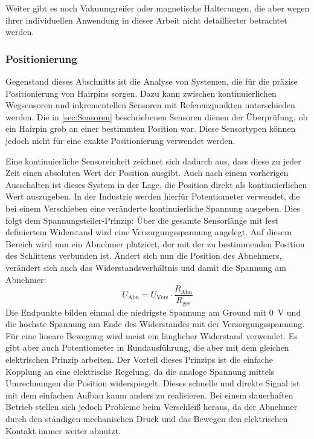 Weiter gibt es noch Vakuumgreifer oder magnetische Halterungen, die aber wegen ihrer individuellen Anwendung in dieser Arbeit
nicht detaillierter betrachtet werden.

%
%
\subsubsection{Positionierung}\label{sec:PositionierungsSystem}
Gegenstand dieses Abschnitts ist die Analyse von Systemen, die für die präzise Positionierung von Hairpins sorgen. Dazu kann
zwischen kontinuierlichen Wegsensoren und inkrementellen Sensoren mit Referenzpunkten unterschieden werden. Die in \cref{sec:Sensoren}
beschriebenen Sensoren dienen der Überprüfung, ob ein Hairpin grob an einer bestimmten Position war. Diese Sensortypen
können jedoch nicht für eine exakte Positionierung verwendet werden.

Eine kontinuierliche Sensoreinheit zeichnet sich dadurch aus, dass diese zu jeder Zeit einen absoluten Wert der Position ausgibt.
Auch nach einem vorherigen Ausschalten ist dieses System in der Lage, die Position direkt als kontinuierlichen Wert
auszugeben. In der Industrie werden hierfür Potentiometer verwendet, die bei einem Verschieben eine veränderte kontinuierliche
Spannung ausgeben. Dies folgt dem Spannungsteiler-Prinzip: Über die gesamte Sensorlänge mit fest definiertem Widerstand wird eine
Versorgungsspannung angelegt. Auf diesem Bereich wird nun ein Abnehmer platziert, der mit der zu bestimmenden Position des Schlittens
verbunden ist. Ändert sich nun die Position des Abnehmers, verändert sich auch das Widerstandsverhältnis und damit die Spannung am Abnehmer:
\begin{equation}\label{eq:Spannungsteiler}
  U_\mathrm{Abn} = U_\mathrm{Vers} \cdot \frac{R_\mathrm{Abn}}{R_\mathrm{ges}}
\end{equation}
Die Endpunkte bilden einmal die niedrigste Spannung am Ground mit \qty{0}{\volt} und die höchste Spannung am Ende des Widerstandes mit der Versorgungsspannung.
Für eine lineare Bewegung wird meist ein länglicher Widerstand verwendet. Es gibt aber auch Potentiometer in Rundausführung, die
aber mit dem gleichen elektrischen Prinzip arbeiten. Der Vorteil dieses Prinzips ist die einfache Kopplung an eine elektrische Regelung,
da die analoge Spannung mittels Umrechnungen die Position widerspiegelt. Dieses schnelle und direkte Signal
ist mit dem einfachen Aufbau kaum anders zu realisieren. Bei einem dauerhaften Betrieb stellen sich jedoch Probleme beim Verschleiß
heraus, da der Abnehmer durch den ständigen mechanischen Druck und das Bewegen den elektrischen Kontakt immer weiter abnutzt.

